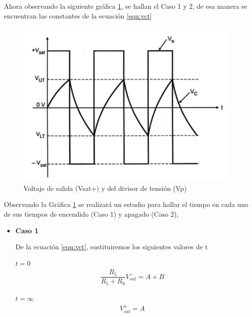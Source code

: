 \begin{enumerate}
                Ahora observando la siguiente gráfica \ref{fig:astable_sal_ent}, se hallan el Caso 1 y 2, de esa manera se encuentran las constantes de la ecuación \ref{eqn:vct}

                \begin{figure}[H]
                    \centering
                    \includegraphics{Imagenes/astable_sal_ent.png}
                    \caption{Voltaje de salida (Vsat+) y del divisor de tensión (Vp)}
                    \label{fig:astable_sal_ent}
                \end{figure}

                Observando la Gráfica \ref{fig:astable_sal_ent} se realizará un estudio para hallar el tiempo en cada uno de sus tiempos de encendido (Caso 1) y apagado (Caso 2), 
                
                \begin{itemize}
            
                    \item      \textbf{Caso 1}

                        De la ecuación \ref{eqn:vct}, sustituiremos los siguientes valores de t
                        
                        $t=0$
                        \begin{gather}
                            \dfrac{R_5}{R_5+R_8}V_{sat}^-=A+B \label{eqn:a+b}
                        \end{gather}

                        $t=\infty$
                        \begin{gather}
                            V_{sat}^+=A \label{eqn:a}
                        \end{gather}


\end{itemize}
\end{enumerate}
